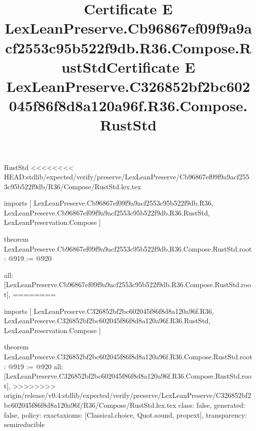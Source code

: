 \begin{lexlean}{RustStd}
<<<<<<<< HEAD:stdlib/expected/verify/preserve/LexLeanPreserve/Cb96867ef09f9a9acf2553c95b522f9db/R36/Compose/RustStd.lex.tex
\title{Certificate E LexLeanPreserve.Cb96867ef09f9a9acf2553c95b522f9db.R36.Compose.RustStd}
\begin{coremodule}
imports [
  LexLeanPreserve.Cb96867ef09f9a9acf2553c95b522f9db.R36,
  LexLeanPreserve.Cb96867ef09f9a9acf2553c95b522f9db.R36.RustStd,
  LexLeanPreservation.Compose
]

theorem LexLeanPreserve.Cb96867ef09f9a9acf2553c95b522f9db.R36.Compose.RustStd.root : @919 := @920 {
  all: [LexLeanPreserve.Cb96867ef09f9a9acf2553c95b522f9db.R36.Compose.RustStd.root],
========
\title{Certificate E LexLeanPreserve.C326852bf2bc602045f86f8d8a120a96f.R36.Compose.RustStd}
\begin{coremodule}
imports [
  LexLeanPreserve.C326852bf2bc602045f86f8d8a120a96f.R36,
  LexLeanPreserve.C326852bf2bc602045f86f8d8a120a96f.R36.RustStd,
  LexLeanPreservation.Compose
]

theorem LexLeanPreserve.C326852bf2bc602045f86f8d8a120a96f.R36.Compose.RustStd.root : @919 := @920 {
  all: [LexLeanPreserve.C326852bf2bc602045f86f8d8a120a96f.R36.Compose.RustStd.root],
>>>>>>>> origin/release/v0.4:stdlib/expected/verify/preserve/LexLeanPreserve/C326852bf2bc602045f86f8d8a120a96f/R36/Compose/RustStd.lex.tex
  class: false,
  generated: false,
  policy: exact{axioms: [Classical.choice, Quot.sound, propext]},
  transparency: semireducible
}


\end{coremodule}}
\end{coremodule}
\end{lexlean}
